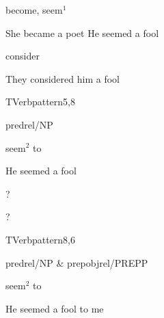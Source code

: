 
\begin{thetadescr}
\evitem  become, seem$^{1}$
\esitem
     \begin{examples}
        \example She became a poet
        \example He seemed a fool
     \end{examples}
\end{thetadescr}



\begin{thetadescr}
\evitem  consider
\esitem
     \begin{examples}
        \example They considered him a fool
     \end{examples}
\end{thetadescr}


\newpage
{}
\begin{vpattern}
 TVerbpattern5,8
\csritem \mbox{}\\
     \begin{csr}
       predrel/NP
     \end{csr}
\remarksitem
\end{vpattern}


\begin{thetadescr}
\evitem  seem$^{2}$ to
\esitem
     \begin{examples}
        \example He seemed a fool
     \end{examples}
\end{thetadescr}



\begin{thetadescr}
\evitem ?
\esitem
     \begin{examples}
        \example ?
     \end{examples}
\end{thetadescr}


\newpage
{}
\begin{vpattern}
 TVerbpattern8,6
\csritem \mbox{}\\
     \begin{csr}
       predrel/NP & prepobjrel/PREPP
     \end{csr}
\remarksitem
\end{vpattern}

\begin{thetadescr}
\evitem  seem$^{2}$ to
\esitem
     \begin{examples}
        \example He seemed a fool to me
     \end{examples}
\end{thetadescr}


